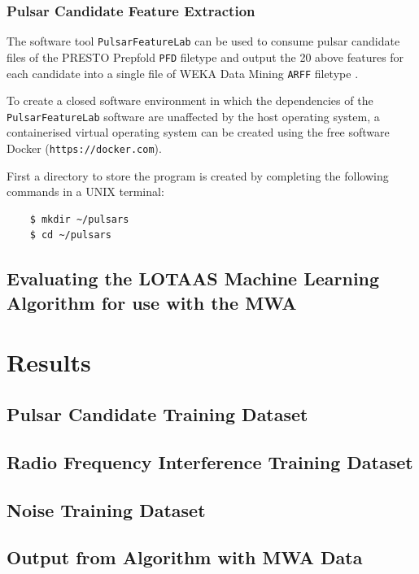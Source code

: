 \documentclass{article}
\begin{document}
\subsubsection{Pulsar Candidate Feature Extraction}

The software tool \verb|PulsarFeatureLab| can be used to consume pulsar candidate files of the PRESTO Prepfold \verb|PFD| filetype and output the 20 above features for each candidate into a single file of WEKA Data Mining \verb|ARFF| filetype \autocite{lyon}.

To create a closed software environment in which the dependencies of the \verb|PulsarFeatureLab| software are unaffected by the host operating system, a containerised virtual operating system can be created using the free software Docker (\verb|https://docker.com|).

First a directory to store the program is created by completing the following commands in a UNIX terminal:

\begin{center}
\begin{verbatim}
    $ mkdir ~/pulsars
    $ cd ~/pulsars
\end{verbatim}
\end{center}
    
\subsection{Evaluating the LOTAAS Machine Learning Algorithm for use with the MWA}

\pagebreak
\section{Results}
\subsection{Pulsar Candidate Training Dataset}
\subsection{Radio Frequency Interference Training Dataset}
\subsection{Noise Training Dataset}
\subsection{Output from Algorithm with MWA Data}
\end{document}
